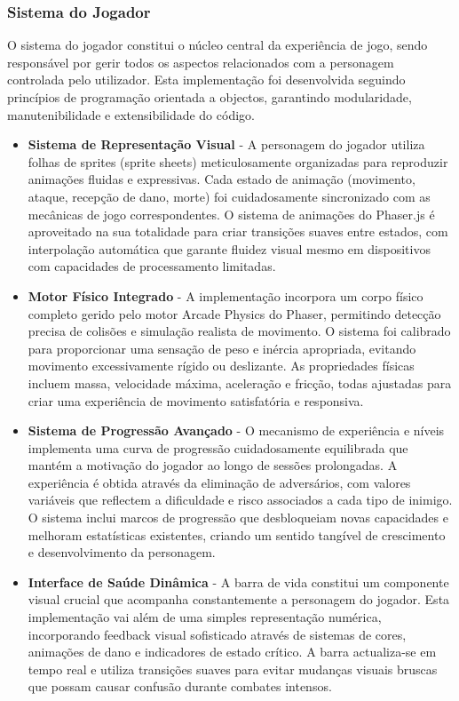 \subsubsection{Sistema do Jogador}
\hspace{2em} O sistema do jogador constitui o núcleo central da experiência de jogo, sendo responsável por gerir todos os aspectos relacionados com a personagem controlada pelo utilizador. Esta implementação foi desenvolvida seguindo princípios de programação orientada a objectos, garantindo modularidade, manutenibilidade e extensibilidade do código.

\begin{itemize}
  \item \textbf{Sistema de Representação Visual} - A personagem do jogador utiliza folhas de sprites (sprite sheets) meticulosamente organizadas para reproduzir animações fluidas e expressivas. Cada estado de animação (movimento, ataque, recepção de dano, morte) foi cuidadosamente sincronizado com as mecânicas de jogo correspondentes. O sistema de animações do Phaser.js é aproveitado na sua totalidade para criar transições suaves entre estados, com interpolação automática que garante fluidez visual mesmo em dispositivos com capacidades de processamento limitadas.
  
  \item \textbf{Motor Físico Integrado} - A implementação incorpora um corpo físico completo gerido pelo motor Arcade Physics do Phaser, permitindo detecção precisa de colisões e simulação realista de movimento. O sistema foi calibrado para proporcionar uma sensação de peso e inércia apropriada, evitando movimento excessivamente rígido ou deslizante. As propriedades físicas incluem massa, velocidade máxima, aceleração e fricção, todas ajustadas para criar uma experiência de movimento satisfatória e responsiva.
  
  \item \textbf{Sistema de Progressão Avançado} - O mecanismo de experiência e níveis implementa uma curva de progressão cuidadosamente equilibrada que mantém a motivação do jogador ao longo de sessões prolongadas. A experiência é obtida através da eliminação de adversários, com valores variáveis que reflectem a dificuldade e risco associados a cada tipo de inimigo. O sistema inclui marcos de progressão que desbloqueiam novas capacidades e melhoram estatísticas existentes, criando um sentido tangível de crescimento e desenvolvimento da personagem.
  
  \item \textbf{Interface de Saúde Dinâmica} - A barra de vida constitui um componente visual crucial que acompanha constantemente a personagem do jogador. Esta implementação vai além de uma simples representação numérica, incorporando feedback visual sofisticado através de sistemas de cores, animações de dano e indicadores de estado crítico. A barra actualiza-se em tempo real e utiliza transições suaves para evitar mudanças visuais bruscas que possam causar confusão durante combates intensos.
  

\end{itemize}
